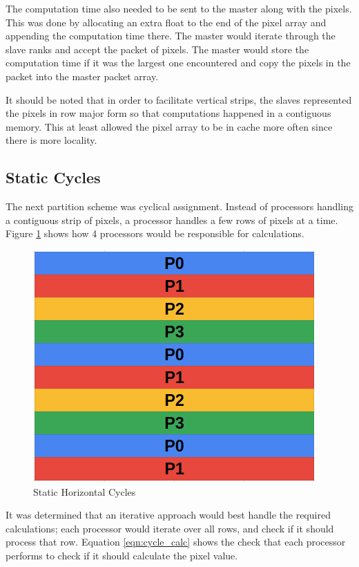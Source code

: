 \documentclass[11pt]{article}
\begin{document}
		The computation time also needed to be sent to the master along with the pixels. This was done by allocating an extra float to the end of the pixel array and appending the computation time there. The master would iterate through the slave ranks and accept the packet of pixels. The master would store the computation time if it was the largest one encountered and copy the pixels in the packet into the master packet array. 
		
		It should be noted that in order to facilitate vertical strips, the slaves represented the pixels in row major form so that computations happened in a contiguous memory. This at least allowed the pixel array to be in cache more often since there is more locality. 
	
	\subsection{Static Cycles}
	
		The next partition scheme was cyclical assignment. Instead of processors handling a contiguous strip of pixels, a processor handles a few rows of pixels at a time. Figure \ref{fig:cycles} shows how 4 processors would be responsible for calculations. 
		
		\begin{figure}[H]
			\centering
			\includegraphics[width=0.7\linewidth]{Pictures/Cycles}
			\caption{Static Horizontal Cycles}
			\label{fig:cycles}
		\end{figure}
	
		It was determined that an iterative approach would best handle the required calculations; each processor would iterate over all rows, and check if it should process that row. Equation \ref{eqn:cycle_calc} shows the check that each processor performs to check if it should calculate the pixel value.
	
\end{document}
